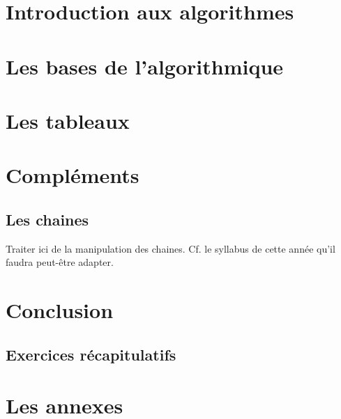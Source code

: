 \documentclass[a4paper,doubleside]{book}
\begin{document}

	
	
	

	\part{Introduction aux algorithmes}	
		
		
		

	\part{Les bases de l'algorithmique}
		
		
		
		
		

	\part{Les tableaux}
		
		
		
		
			
	\part{Compléments}
		\chapter{Les chaines}
			\begin{Note}
			Traiter ici de la manipulation des chaines.
			Cf. le syllabus de cette année
			qu'il faudra peut-être adapter.
			\end{Note}

		

	\part{Conclusion}
		\chapter{Exercices récapitulatifs}

	
	\appendix
	
	\part{Les annexes}
		
		
	
	
\end{document}
